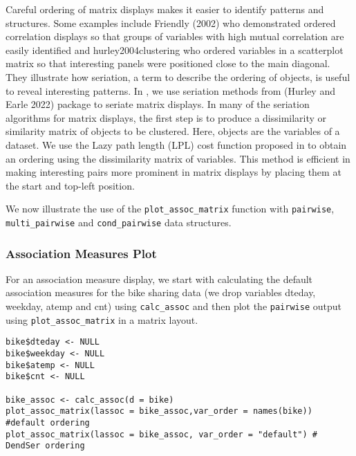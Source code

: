 Careful ordering of matrix displays makes it easier to identify patterns and structures. Some examples include Friendly (2002) who demonstrated ordered correlation displays so that groups of variables with high mutual correlation are easily identified and hurley2004clustering who ordered variables in a scatterplot matrix so that interesting panels were positioned close to the main diagonal. They illustrate how seriation, a term to describe the ordering of objects, is useful to reveal interesting patterns. In , we use seriation methods from  (Hurley and Earle 2022) package to seriate matrix displays. In many of the seriation algorithms for matrix displays, the first step is to produce a dissimilarity or similarity matrix of objects to be clustered. Here, objects are the variables of a dataset. We use the Lazy path length (LPL) cost function proposed in  to obtain an ordering using the dissimilarity matrix of variables. This method is efficient in making interesting pairs more prominent in matrix displays by placing them at the start and top-left position.

We now illustrate the use of the \texttt{plot\_assoc\_matrix} function with \texttt{pairwise}, \texttt{multi\_pairwise} and \texttt{cond\_pairwise} data structures.

\hypertarget{association-measures-plot}{%
\subsubsection{Association Measures Plot}\label{association-measures-plot}}

For an association measure display, we start with calculating the default association measures for the bike sharing data (we drop variables dteday, weekday, atemp and cnt) using \texttt{calc\_assoc} and then plot the \texttt{pairwise} output using \texttt{plot\_assoc\_matrix} in a matrix layout.

\begin{verbatim}
bike$dteday <- NULL 
bike$weekday <- NULL
bike$atemp <- NULL
bike$cnt <- NULL

bike_assoc <- calc_assoc(d = bike)
plot_assoc_matrix(lassoc = bike_assoc,var_order = names(bike)) #default ordering
plot_assoc_matrix(lassoc = bike_assoc, var_order = "default") # DendSer ordering
\end{verbatim}

